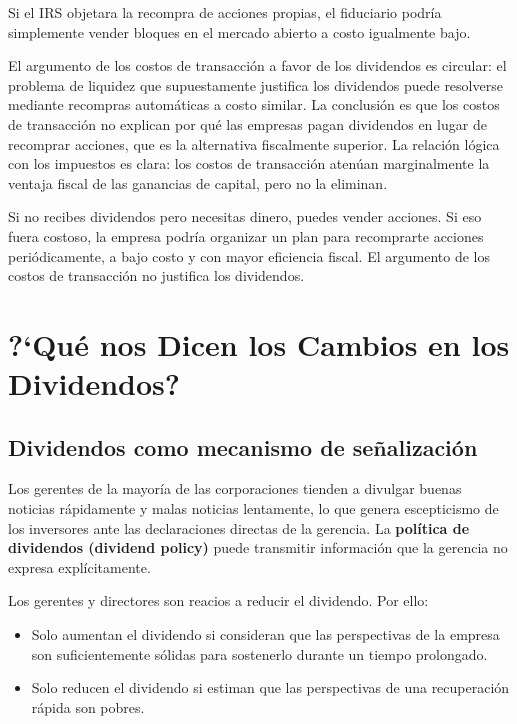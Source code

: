 \documentclass[12pt]{article}
\begin{document}
Si el IRS objetara la recompra de acciones propias, el fiduciario podr\'ia simplemente vender bloques en el mercado abierto a costo igualmente bajo.

\begin{explicacion}
El argumento de los costos de transacci\'on a favor de los dividendos es circular: el problema de liquidez que supuestamente justifica los dividendos puede resolverse mediante recompras autom\'aticas a costo similar. La conclusi\'on es que los costos de transacci\'on no explican por qu\'e las empresas pagan dividendos en lugar de recomprar acciones, que es la alternativa fiscalmente superior. La relaci\'on l\'ogica con los impuestos es clara: los costos de transacci\'on aten\'uan marginalmente la ventaja fiscal de las ganancias de capital, pero no la eliminan.
\end{explicacion}

\begin{intuicion}
Si no recibes dividendos pero necesitas dinero, puedes vender acciones. Si eso fuera costoso, la empresa podr\'ia organizar un plan para recomprarte acciones peri\'odicamente, a bajo costo y con mayor eficiencia fiscal. El argumento de los costos de transacci\'on no justifica los dividendos.
\end{intuicion}

\section{?`Qu\'e nos Dicen los Cambios en los Dividendos?}

\subsection{Dividendos como mecanismo de se\~nalizaci\'on}

Los gerentes de la mayor\'ia de las corporaciones tienden a divulgar buenas noticias r\'apidamente y malas noticias lentamente, lo que genera escepticismo de los inversores ante las declaraciones directas de la gerencia. La \textbf{pol\'itica de dividendos (dividend policy)} puede transmitir informaci\'on que la gerencia no expresa expl\'icitamente.

Los gerentes y directores son reacios a reducir el dividendo. Por ello:
\begin{itemize}
  \item Solo aumentan el dividendo si consideran que las perspectivas de la empresa son suficientemente s\'olidas para sostenerlo durante un tiempo prolongado.
  \item Solo reducen el dividendo si estiman que las perspectivas de una recuperaci\'on r\'apida son pobres.
\end{itemize}
\end{document}
